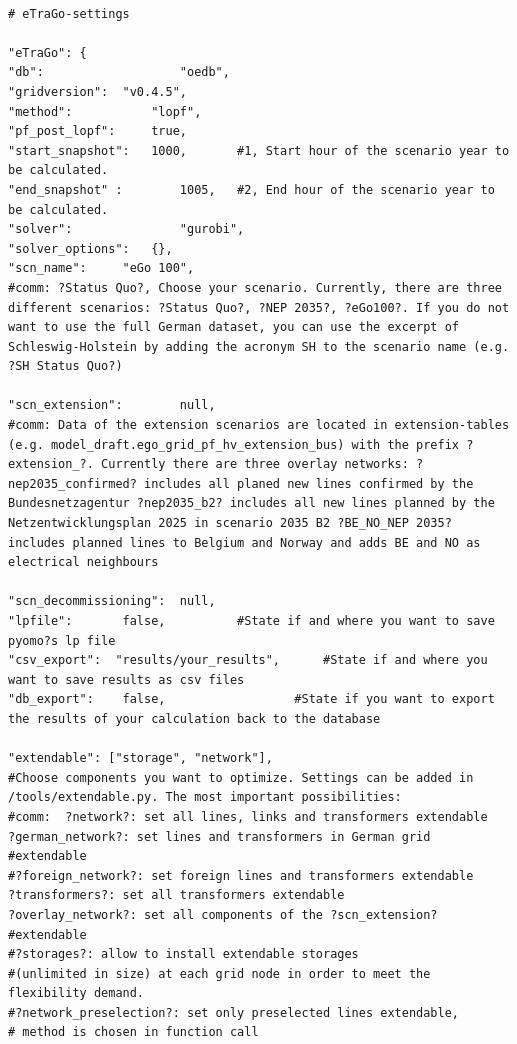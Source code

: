 \documentclass[
a4paper,     %
12pt         %
]{scrartcl}  %
\begin{document}
\begin{lstlisting}

# eTraGo-settings

"eTraGo": {
"db": 					"oedb",
"gridversion": 	"v0.4.5",
"method": 			"lopf",
"pf_post_lopf": 	true,
"start_snapshot": 	1000,		#1, Start hour of the scenario year to be calculated.
"end_snapshot" : 		1005, 	#2, End hour of the scenario year to be calculated.
"solver": 				"gurobi",
"solver_options":	{},
"scn_name": 	"eGo 100",
#comm: ?Status Quo?, Choose your scenario. Currently, there are three different scenarios: ?Status Quo?, ?NEP 2035?, ?eGo100?. If you do not want to use the full German dataset, you can use the excerpt of Schleswig-Holstein by adding the acronym SH to the scenario name (e.g. ?SH Status Quo?)

"scn_extension": 		null,
#comm: Data of the extension scenarios are located in extension-tables (e.g. model_draft.ego_grid_pf_hv_extension_bus) with the prefix ?extension_?. Currently there are three overlay networks: ?nep2035_confirmed? includes all planed new lines confirmed by the Bundesnetzagentur ?nep2035_b2? includes all new lines planned by the Netzentwicklungsplan 2025 in scenario 2035 B2 ?BE_NO_NEP 2035? includes planned lines to Belgium and Norway and adds BE and NO as electrical neighbours

"scn_decommissioning": 	null,
"lpfile":  		false, 			#State if and where you want to save pyomo?s lp file
"csv_export":  "results/your_results", 		#State if and where you want to save results as csv files
"db_export": 	false,					#State if you want to export the results of your calculation back to the database

"extendable": ["storage", "network"],
#Choose components you want to optimize. Settings can be added in /tools/extendable.py. The most important possibilities:
#comm: 	?network?: set all lines, links and transformers extendable 		   ?german_network?: set lines and transformers in German grid
#extendable
#?foreign_network?: set foreign lines and transformers extendable					 ?transformers?: set all transformers extendable 												?overlay_network?: set all components of the ?scn_extension?
#extendable
#?storages?: allow to install extendable storages
#(unlimited in size) at each grid node in order to meet the flexibility demand.
#?network_preselection?: set only preselected lines extendable,
# method is chosen in function call



\end{lstlisting}
\end{document}
